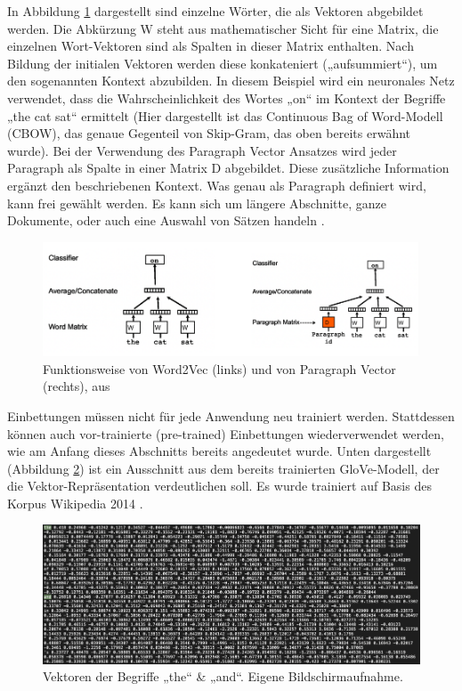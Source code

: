In Abbildung \ref{Abbildung:mikolov} dargestellt sind einzelne Wörter, die als Vektoren abgebildet werden. Die Abkürzung W steht aus mathematischer Sicht für eine Matrix, die einzelnen Wort-Vektoren sind als Spalten in dieser Matrix enthalten. Nach Bildung der initialen Vektoren werden diese konkateniert („aufsummiert“), um den sogenannten Kontext abzubilden. In diesem Beispiel wird ein neuronales Netz verwendet, dass die Wahrscheinlichkeit des Wortes „on“ im Kontext der Begriffe „the cat sat“ ermittelt (Hier dargestellt ist das Continuous Bag of Word-Modell (CBOW), das genaue Gegenteil von Skip-Gram, das oben bereits erwähnt wurde). Bei der Verwendung des Paragraph Vector Ansatzes wird jeder Paragraph als Spalte in einer Matrix D abgebildet. Diese zusätzliche Information ergänzt den beschriebenen Kontext. Was genau als Paragraph definiert wird, kann frei gewählt werden. Es kann sich um längere Abschnitte, ganze Dokumente, oder auch eine Auswahl von Sätzen handeln \cite{mikolov2014}.
 
\begin{figure}[h]
\centering
\includegraphics[scale=0.9]{content/pics/Picture_5.png}
\caption{Funktionsweise von Word2Vec (links) und von Paragraph Vector (rechts), aus \cite{mikolov2014}}
\label{Abbildung:mikolov}
\end{figure}

Einbettungen müssen nicht für jede Anwendung neu trainiert werden. Stattdessen können auch vor-trainierte (pre-trained) Einbettungen wiederverwendet werden, wie am Anfang dieses Abschnitts bereits angedeutet wurde. Unten dargestellt (Abbildung \ref{Abbildung:word_vecs}) ist ein Ausschnitt aus dem bereits trainierten GloVe-Modell, der die Vektor-Repräsentation verdeutlichen soll. Es wurde trainiert auf Basis des Korpus Wikipedia 2014 \cite{stanford}.

\begin{figure}[h]
\centering
\includegraphics[scale=0.9]{content/pics/Picture_6.png}
\caption{Vektoren der Begriffe „the“ \& „and“. Eigene Bildschirmaufnahme.}
\label{Abbildung:word_vecs}
\end{figure}
 

